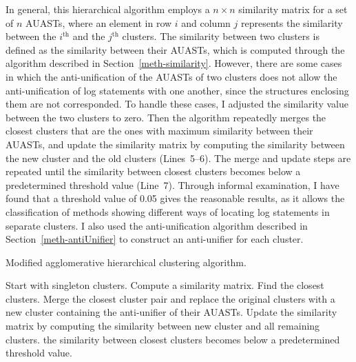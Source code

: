 In general, this hierarchical algorithm employs a $n \times n$ similarity matrix for a set of $n$ AUASTs, where an element in row $i$ and column $j$ represents the similarity between the $i^{\text{th}}$ and the $j^{\text{th}}$ clusters. The similarity between two clusters is defined as the similarity between their AUASTs, which is computed through the algorithm described in Section~\ref{meth-similarity}. However, there are some cases in which the anti-unification of the AUASTs of two clusters does not allow the anti-unification of log statements with one another, since the structures enclosing them are not corresponded. To handle these cases, I adjusted the similarity value between the two clusters to zero. Then the algorithm repeatedly merges the closest clusters that are the ones with maximum similarity between their AUASTs, and update the similarity matrix by computing the similarity between the new cluster and the old clusters (Lines~5--6). The merge and update steps are repeated until the similarity between closest clusters becomes below a predetermined threshold value (Line~7). Through informal examination, I have found that a threshold value of 0.05 gives the reasonable results, as it allows the classification of methods showing different ways of locating log statements in separate clusters. I also used the anti-unification algorithm described in Section~\ref{meth-antiUnifier} to construct an anti-unifier for each cluster.



\begin{algorithm}
\caption{Modified agglomerative hierarchical clustering algorithm.} \label{modified-agglomerative}
\begin{algorithmic}[1]
\State Start with singleton clusters.
\State Compute a similarity matrix.
\Repeat
\State Find the closest clusters.
\State Merge the closest cluster pair and replace the original clusters with a new cluster containing the anti-unifier of their AUASTs.
\State Update the similarity matrix by computing the similarity between new cluster and all remaining clusters.
\Until the similarity between closest clusters becomes below a predetermined threshold value.
\end{algorithmic}
\end{algorithm}



